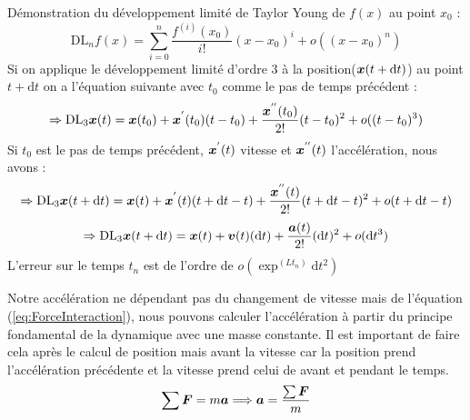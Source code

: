 \documentclass[a4paper, 11pt, oneside]{article} %
\newcommand{\dd}[1]{\mathrm{d}#1}
\begin{document}
        Démonstration du développement limité de Taylor Young de $f(x)$ au point $x_0$\cite{agarwal_introduction_2011} :%
        \begin{equation}
            \mathrm{DL}_n f(x) = \sum_{i=0}^{n}\frac{f^{(i)}(x_0)}{i!}(x-x_0)^i+ o((x-x_0)^n)
        \end{equation}
        Si on applique le développement limité d'ordre 3 à la position($\vb*{x}(t+\dd t)$) au point $t+\dd t$ on a l'équation suivante avec $t_0$ comme le pas de temps précédent :
        \begin{equation}
            \Rightarrow\mathrm{DL}_3 \vb*{x}(t) = \vb*{x}(t_0)+\vb*{x}^{'}(t_0)(t-t_0)+\frac{\vb*{x}^{''}(t_0)}{2!}(t-t_0)^2 +o((t-t_0)^3)
        \end{equation}
        Si $t_0$ est le pas de temps précédent, $\vb*{x}^{'}(t)$ vitesse et $\vb*{x}^{''}(t)$ l'accélération, nous avons :
        \begin{equation}
            \Rightarrow\mathrm{DL}_3 \vb*{x}(t+\dd t) = \vb*{x}(t)+\vb*{x}^{'}(t)(t+\dd t-t)+\frac{\vb*{x}^{''}(t)}{2!}(t+\dd t-t)^2+o(t+\dd t-t)
        \end{equation}
        \begin{equation}
            \Rightarrow \mathrm{DL}_3 \vb*{x}(t+\dd t)= \vb*{x}(t)+\vb*{v}(t)(\dd t)+\frac{\vb*{a}(t)}{2!}(\dd t)^2+o(\dd t^3)
        \end{equation}
        L'erreur sur le temps $t_n$ est de l'ordre de $o(\exp^(Lt_n)\dd t^2)$ %

        Notre accélération ne dépendant pas du changement de vitesse mais de l'équation (\ref{eq:ForceInteraction}), nous pouvons calculer l'accélération à partir du principe fondamental de la dynamique avec une masse constante. Il est important de faire cela après le calcul de position mais avant la vitesse car la position prend l'accélération précédente et la vitesse prend celui de avant et pendant le temps.
        \begin{equation}
            \label{PFD}
            \sum  \vb*{F} = m\vb*{a} \Longrightarrow \vb*{a} = \frac{\sum \vb*{F}}{m}
        \end{equation}
\end{document}
